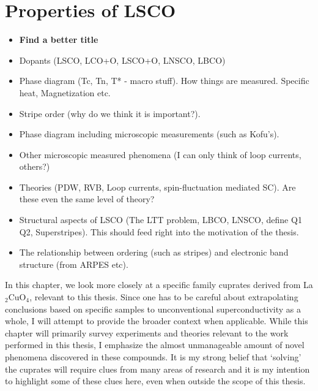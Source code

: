 \chapter{Properties of LSCO}

\begin{framed}
    \begin{itemize}
        \item \textbf{Find a better title}
        \item Dopants (LSCO, LCO+O, LSCO+O, LNSCO, LBCO)
        \item Phase diagram (Tc, Tn, T* - macro stuff). How things are measured. Specific heat, Magnetization etc.
        \item Stripe order (why do we think it is important?). 
        \item Phase diagram including microscopic measurements (such as Kofu's).
        \item Other microscopic measured phenomena (I can only think of loop currents, others?)
        \item Theories (PDW, RVB, Loop currents, spin-fluctuation mediated SC). Are these even the same level of theory?
        \item Structural aspects of LSCO (The LTT problem, LBCO, LNSCO, define Q1 Q2, Superstripes). This should feed right into the motivation of the thesis.
        \item The relationship between ordering (such as stripes) and electronic band structure (from ARPES etc).
    \end{itemize}
\end{framed}

In this chapter, we look more closely at a specific family cuprates derived from La$_2$CuO$_4$, relevant to this thesis. Since one has to be careful about extrapolating conclusions based on specific samples to unconventional superconductivity as a whole, I will attempt to provide the broader context when applicable. While this chapter will primarily survey experiments and theories relevant to the work performed in this thesis, I emphasize the almost unmanageable amount of novel phenomena discovered in these compounds. It is my strong belief that `solving' the cuprates will require clues from many areas of research and it is my intention to highlight some of these clues here, even when outside the scope of this thesis.


